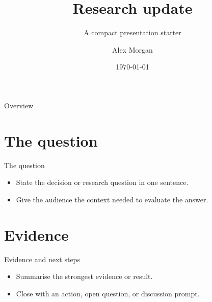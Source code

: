 \documentclass[english]{FUpowerdot}
\title{Research update}
\subtitle{A compact presentation starter}
\author{Alex Morgan}
\institute{Example Research Group}
\date{\today}
\begin{document}
\maketitle

\begin{slide}[toc=]{Overview}
  \tableofcontents
\end{slide}

\section{The question}
\begin{slide}{The question}
  \begin{itemize}
    \item State the decision or research question in one sentence.
    \item Give the audience the context needed to evaluate the answer.
  \end{itemize}
\end{slide}

\section{Evidence}
\begin{slide}{Evidence and next steps}
  \begin{itemize}
    \item Summarise the strongest evidence or result.
    \item Close with an action, open question, or discussion prompt.
  \end{itemize}
\end{slide}
\end{document}
